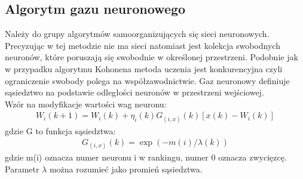 \documentclass{classrep}
\begin{document}
{\subsection{Algorytm gazu neuronowego}
{
Należy do grupy algorytmów samoorganizujących się sieci neuronowych. Precyzując w tej metodzie nie ma sieci natomiast
jest kolekcja swobodnych neuronów, które poruszają się swobodnie w określonej przestrzeni. Podobnie jak w przypadku
algorytmu Kohonena metoda uczenia jest konkurencyjna czyli ograniczenie swobody polega na współzawodnictwie.
Gaz neuronowy definiuje sąsiedztwo na podstawie odległości neuronów w przestrzeni wejściowej. \\

Wzór na modyfikacje wartości wag neuronu:
\begin{align*}
W_i(k+1)=W_i(k)+\eta_i(k)G_{(i,x)}(k)[x(k)-W_i(k)]
\end{align*}
gdzie G to funkcja sąsiedztwa:
\begin{align*}
G_{(i,x)}(k)=\exp(-m(i)/\lambda(k))
\end{align*}
gdzie m(i) oznacza numer neuronu i w rankingu, numer 0 oznacza zwycięzcę.\\
Parametr $\lambda$ można rozumieć jako promień sąsiedztwa.
}
}
\end{document}
